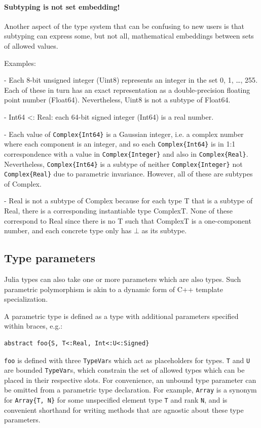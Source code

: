 \documentclass[pldi]{sigplanconf-pldi15}
\begin{document}
\paragraph{Subtyping is not set embedding!}
Another aspect of the type system that can be confusing to new users is that
subtyping can express some, but not all, mathematical embeddings between sets
of allowed values.

Examples:

- Each 8-bit unsigned integer (Uint8) represents an integer in the set {0, 1,
\dots, 255}. Each of these in turn has an exact representation as a
double-precision floating point number (Float64). Nevertheless, Uint8 is not a
subtype of Float64.

- Int64 <: Real: each 64-bit signed integer (Int64) is a real number.

- Each value of \verb|Complex{Int64}| is a Gaussian integer, i.e. a complex number
where each component is an integer, and so each \verb|Complex{Int64}| is in 1:1
correspondence with a value in \verb|Complex{Integer}| and also in \verb|Complex{Real}|.
Nevertheless, \verb|Complex{Int64}| is a subtype of neither \verb|Complex{Integer}| not
\verb|Complex{Real}| due to parametric invariance. However, all of these are subtypes
of Complex.

- Real is not a subtype of Complex because for each type T that is a subtype of
Real, there is a corresponding instantiable type Complex{T}. None of these
correspond to Real since there is no T such that Complex{T} is a one-component
number, and each concrete type only has $\bot$ as its subtype.  


\subsection{Type parameters}

Julia types can also take one or more parameters which are also types. Such
parametric polymorphism is akin to a dynamic form of C++ template
specialization.

A parametric type is defined as a type with additional parameters specified
within braces, e.g.:

\begin{lstlisting}
abstract foo{S, T<:Real, Int<:U<:Signed}
\end{lstlisting}
%
\verb|foo| is defined with three \verb|TypeVar|s which act as placeholders for
types. \verb|T| and \verb|U| are bounded \verb|TypeVar|s, which constrain the
set of allowed types which can be placed in their respective slots. For
convenience, an unbound type parameter can be omitted from a parametric type
declaration. For example, \verb|Array| is a synonym for \verb|Array{T, N}|
for some unspecified element type \verb|T| and rank \verb|N|, and is convenient
shorthand for writing methods that are agnostic about these type parameters.
\end{document}

